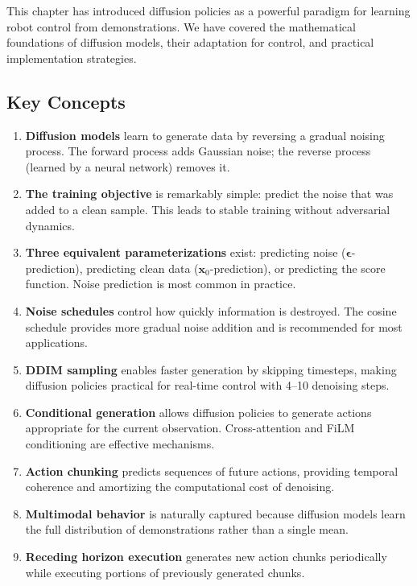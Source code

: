 This chapter has introduced diffusion policies as a powerful paradigm for learning robot control from demonstrations. We have covered the mathematical foundations of diffusion models, their adaptation for control, and practical implementation strategies.

\subsection{Key Concepts}

\begin{enumerate}
    \item \textbf{Diffusion models} learn to generate data by reversing a gradual noising process. The forward process adds Gaussian noise; the reverse process (learned by a neural network) removes it.

    \item \textbf{The training objective} is remarkably simple: predict the noise that was added to a clean sample. This leads to stable training without adversarial dynamics.

    \item \textbf{Three equivalent parameterizations} exist: predicting noise ($\boldsymbol{\epsilon}$-prediction), predicting clean data ($\mathbf{x}_0$-prediction), or predicting the score function. Noise prediction is most common in practice.

    \item \textbf{Noise schedules} control how quickly information is destroyed. The cosine schedule provides more gradual noise addition and is recommended for most applications.

    \item \textbf{DDIM sampling} enables faster generation by skipping timesteps, making diffusion policies practical for real-time control with 4--10 denoising steps.

    \item \textbf{Conditional generation} allows diffusion policies to generate actions appropriate for the current observation. Cross-attention and FiLM conditioning are effective mechanisms.

    \item \textbf{Action chunking} predicts sequences of future actions, providing temporal coherence and amortizing the computational cost of denoising.

    \item \textbf{Multimodal behavior} is naturally captured because diffusion models learn the full distribution of demonstrations rather than a single mean.

    \item \textbf{Receding horizon execution} generates new action chunks periodically while executing portions of previously generated chunks.
\end{enumerate}

